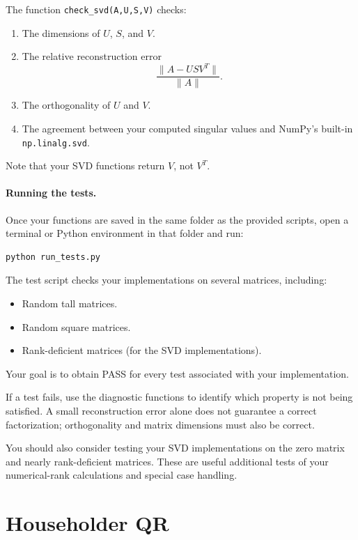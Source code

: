 \documentclass{ximera}
\begin{document}
The function \texttt{check\_svd(A,U,S,V)} checks:

\begin{enumerate}
    \item The dimensions of $U$, $S$, and $V$.
    \item The relative reconstruction error
    \[
    \frac{\|A-USV^T\|}{\|A\|}.
    \]
    \item The orthogonality of $U$ and $V$.
    \item The agreement between your computed singular values and
    NumPy's built-in \texttt{np.linalg.svd}.
\end{enumerate}

Note that your SVD functions return $V$, not $V^T$.

\paragraph{Running the tests.}

Once your functions are saved in the same folder as the provided
scripts, open a terminal or Python environment in that folder
and run:

\begin{verbatim}
python run_tests.py
\end{verbatim}

The test script checks your implementations on several matrices,
including:

\begin{itemize}
    \item Random tall matrices.
    \item Random square matrices.
    \item Rank-deficient matrices (for the SVD implementations).
\end{itemize}

Your goal is to obtain PASS for every test associated with your
implementation.

If a test fails, use the diagnostic functions to identify which
property is not being satisfied. A small reconstruction error alone
does not guarantee a correct factorization; orthogonality and
matrix dimensions must also be correct.

You should also consider testing your SVD implementations on the
zero matrix and nearly rank-deficient matrices. These are useful
additional tests of your numerical-rank calculations and special
case handling.

\section{Householder QR}
\end{document}
